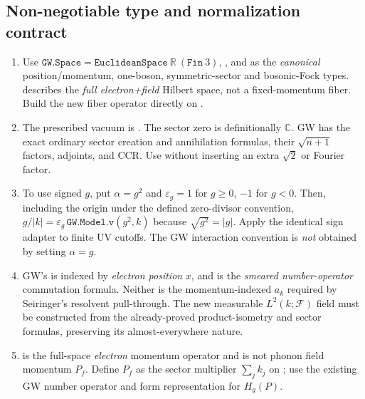 \documentclass[11pt,a4paper]{article}
\theoremstyle{remark}\newtheorem{remark}[theorem]{Remark}
\newcommand{\R}{\mathbb R}\newcommand{\C}{\mathbb C}\newcommand{\N}{\mathbb N}
\newcommand{\F}{\mathcal F}\newcommand{\Q}{\mathcal Q}\newcommand{\HH}{\mathcal H}
\newcommand{\abs}[1]{\lvert #1\rvert}\newcommand{\rankone}[2]{\lvert #1\rangle\langle #2\rvert}
\begin{document}
\subsection{Non-negotiable type and normalization contract}
\begin{enumerate}
\item Use $\texttt{GW.Space}=\texttt{EuclideanSpace}\ \R\ (\texttt{Fin}\ 3)$, ,  and  as the \emph{canonical} position/momentum, one-boson, symmetric-sector and bosonic-Fock types.  describes the \emph{full electron+field} Hilbert space, not a fixed-momentum fiber. Build the new fiber operator directly on .
\item The prescribed vacuum is . The sector zero is definitionally $\C$. GW has the exact ordinary sector creation and annihilation formulas, their $\sqrt{n+1}$ factors, adjoints, and CCR. Use  without inserting an extra $\sqrt{2}$ or Fourier factor.
\item To use signed $g$, put $\alpha=g^2$ and $\varepsilon_g=1$ for $g\ge0$, $-1$ for $g<0$. Then, including the origin under the defined zero-divisor convention, $g/\abs k=\varepsilon_g\,\texttt{GW.Model.v}(g^2,k)$ because $\sqrt{g^2}=\abs g$. Apply the identical sign adapter to finite UV cutoffs. The GW interaction convention is \emph{not} obtained by setting $\alpha=g$.
\item GW's  is indexed by \emph{electron position} $x$, and  is the \emph{smeared number-operator} commutation formula. Neither is the momentum-indexed $a_k$ required by Seiringer's resolvent pull-through. The new measurable $L^2(k;\F)$ field must be constructed from the already-proved product-isometry and sector formulas, preserving its almost-everywhere nature.
\item {} is the full-space \emph{electron} momentum operator and is not phonon field momentum $P_f$. Define $P_f$ as the sector multiplier $\sum_j k_j$ on ; use the existing GW number operator and form representation for $H_g(P)$.
\end{enumerate}
\end{document}
